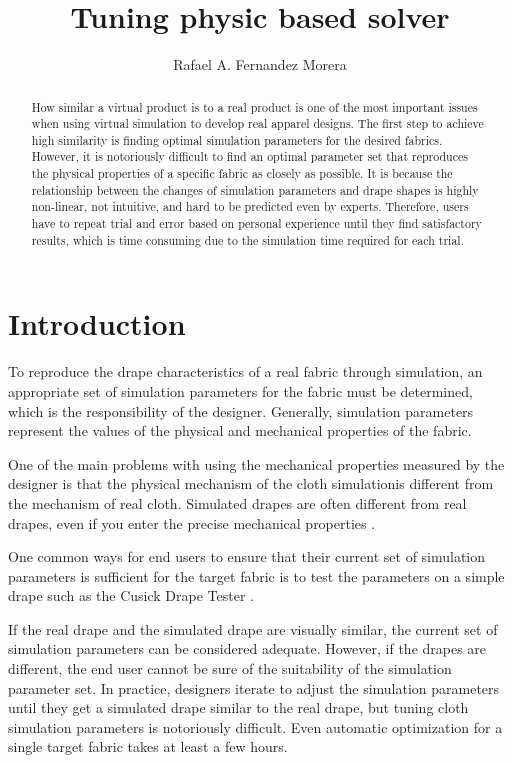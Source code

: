 \documentclass[twocolumn]{article}
\title{Tuning physic based solver}
\author{Rafael A. Fernandez Morera}
\begin{document}
\maketitle

\begin{abstract}
How similar a virtual product is to a real product is one of the most important issues when using virtual simulation to develop real apparel designs. The first step to achieve high similarity is finding optimal simulation parameters for the desired fabrics. However, it is notoriously difficult to find an optimal parameter set that reproduces the physical properties of a specific fabric as closely as possible. It is because the relationship between the changes of simulation parameters and drape shapes is highly non-linear, not intuitive, and hard to be predicted even by experts. Therefore, users have to repeat trial and error based on personal experience until they find satisfactory results, which is time consuming due to the simulation time required for each trial.

\end{abstract}

\section{Introduction}

To reproduce the drape characteristics of a real fabric through simulation, an appropriate set of simulation parameters for the fabric must be determined, which is the responsibility of the designer. Generally, simulation parameters represent the values of the physical and mechanical properties of the fabric. \cite{Ju2020}

One of the main problems with using the mechanical properties measured by the designer is that the physical mechanism of the cloth simulationis different from the mechanism of real cloth. Simulated drapes are often different from real drapes, even if you enter the precise mechanical properties \cite{Ju2020}.

One common ways for end users to ensure that their current set of simulation parameters is sufficient for the target fabric is to test the parameters on a simple drape such as the Cusick Drape Tester \cite{Ju2020} \cite{Cusick2008}.

If the real drape and the simulated drape are visually similar, the current set of simulation parameters can be considered adequate. However, if the drapes are different, the end user cannot be sure of the suitability of the simulation parameter set. In practice, designers iterate to adjust the simulation parameters until they get a simulated drape similar to the real drape, but tuning cloth simulation parameters is notoriously difficult. Even automatic optimization for a single target fabric takes at least a few hours.
\end{document}
